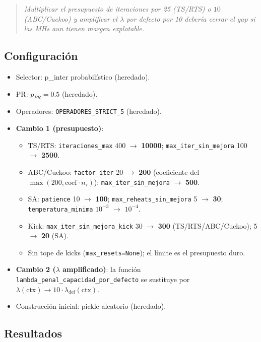 \begin{quote}
\textit{Multiplicar el presupuesto de iteraciones por 25 (TS/RTS) o
$10$ (ABC/Cuckoo) y amplificar el $\lambda$ por defecto por 10
debería cerrar el gap si las MHs aun tienen margen explotable.}
\end{quote}

\subsection{Configuración}

\begin{itemize}
\item Selector: p\_inter probabilístico (heredado).
\item PR: $p_{PR} = 0.5$ (heredado).
\item Operadores: \texttt{OPERADORES\_STRICT\_5} (heredado).
\item \textbf{Cambio 1 (presupuesto)}:
  \begin{itemize}
  \item TS/RTS: \texttt{iteraciones\_max} 400 $\to$ \textbf{10000};
    \texttt{max\_iter\_sin\_mejora} 100 $\to$ \textbf{2500}.
  \item ABC/Cuckoo: \texttt{factor\_iter} 20 $\to$ \textbf{200}
    (coeficiente del $\max(200, \text{coef} \cdot n_\tau)$);
    \texttt{max\_iter\_sin\_mejora} $\to$ \textbf{500}.
  \item SA: \texttt{patience} 10 $\to$ \textbf{100};
    \texttt{max\_reheats\_sin\_mejora} 5 $\to$ \textbf{30};
    \texttt{temperatura\_minima} $10^{-3}$ $\to$ \textbf{$10^{-4}$}.
  \item Kick: \texttt{max\_iter\_sin\_mejora\_kick} 30 $\to$
    \textbf{300} (TS/RTS/ABC/Cuckoo); 5 $\to$ \textbf{20} (SA).
  \item Sin tope de kicks (\texttt{max\_resets=None}); el límite es el
    presupuesto duro.
  \end{itemize}
\item \textbf{Cambio 2 ($\lambda$ amplificado)}: la función
  \texttt{lambda\_penal\_capacidad\_por\_defecto} se sustituye por
  $\lambda(\text{ctx}) \to 10 \cdot \lambda_{\text{def}}(\text{ctx})$.
\item Construcción inicial: pickle aleatorio (heredado).
\end{itemize}

\subsection{Resultados}

